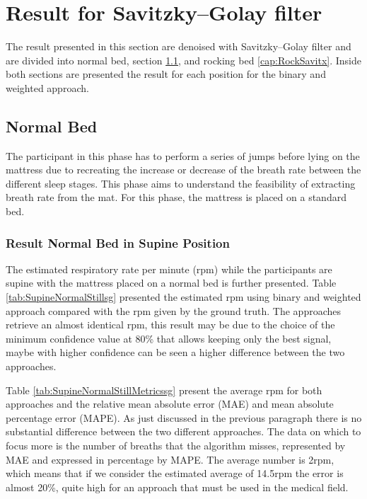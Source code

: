 \section{Result for Savitzky–Golay filter} \label{cap:ResultSG}

The result presented in this section are denoised with Savitzky–Golay filter and are
 divided into normal bed, section \ref{cap:normalSavitz}, and rocking bed \ref{cap:RockSavitx}. Inside both sections are presented the result for each position for the binary and weighted approach.


\subsection{Normal Bed} \label{cap:normalSavitz}

The participant in this phase has to perform a series of jumps before lying on the mattress due to recreating the increase or decrease of the breath rate between the different sleep stages. This phase aims to understand the feasibility of extracting breath rate from the mat. For this phase, the mattress is placed on a standard bed.


\subsubsection{Result Normal Bed in Supine Position}  
The estimated respiratory rate per minute (rpm) while the participants are supine with the mattress placed on a normal bed is further presented. Table \ref{tab:SupineNormalStillsg} presented the estimated rpm using binary and weighted approach compared with the rpm given by the ground truth. The approaches retrieve an almost identical rpm, this result may be due to the choice of the minimum confidence value at 80\% that allows keeping only the best signal, maybe with higher confidence can be seen a higher difference between the two approaches. 

\vspace{0.5cm}


Table \ref{tab:SupineNormalStillMetricssg} present the average rpm for both approaches  
and the relative mean absolute error (MAE) and mean absolute percentage error (MAPE). As just discussed in the previous paragraph there is no substantial difference between the two different approaches. The data on which to focus more is the number of breaths that the algorithm misses, represented by MAE and expressed in percentage by MAPE. The average number is 2rpm, which means that if we consider the estimated average of 14.5rpm the error is almost 20\%, quite high for an approach that must be used in the medical field.

